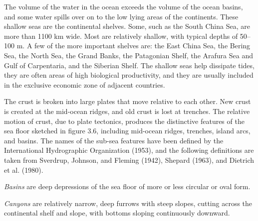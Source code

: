 The volume of the water in the ocean exceeds the volume of the ocean
basins, and some water spills over on to the low lying areas of the
continents. These shallow seas are the continental shelves. Some, such
as the South China Sea, are more than 1100 km wide. Most are
relatively shallow, with typical depths of 50--100 m. A few of the
more important shelves are: the East China Sea, the Bering Sea, the
North Sea, the Grand Banks, the Patagonian Shelf, the Arafura Sea and
Gulf of Carpentaria, and the Siberian Shelf. The shallow seas help
dissipate tides, they are often areas of high biological productivity,
and they are usually included in the exclusive economic zone of
adjacent countries.

The crust is broken into large plates that move relative to each
other. New crust is created at the mid-ocean ridges, and old crust is
lost at trenches. The relative motion of crust, due to plate
tectonics, produces the distinctive features of the sea floor sketched
in figure 3.6, including mid-ocean ridges, trenches, island arcs, and
basins.  The names of the sub-sea features
have been defined by the International Hydrographic
Organization (1953), and the
following definitions are taken from Sverdrup, Johnson, and Fleming
(1942), Shepard (1963), and Dietrich et al. (1980).

\textit{Basins} are deep depressions of the sea
floor of more or less circular or oval form.

\textit{Canyons} are relatively narrow, deep
furrows with steep slopes, cutting across the continental shelf and
slope, with bottoms sloping continuously downward.


